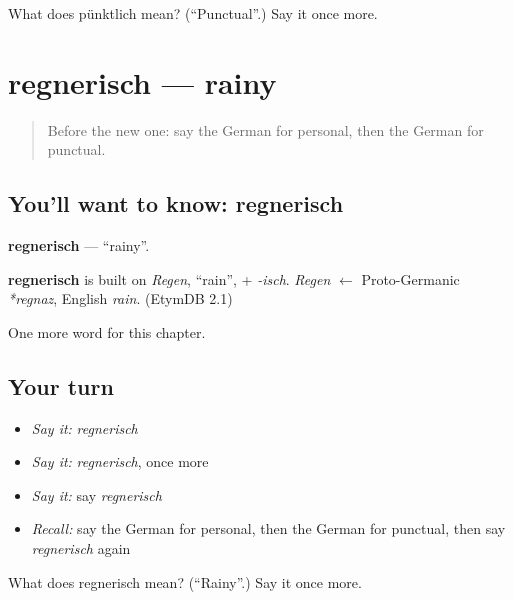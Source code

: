 \begin{tcolorbox}[breakable,colback=teal!4,colframe=teal!35!black,title={Before you move on}]
What does pünktlich mean? (\textquotedblleft{}Punctual\textquotedblright{}.) Say it once more.
\end{tcolorbox}
\section[regnerisch]{regnerisch — rainy}

\label{lesson:GE-C220-regnerisch}



\begin{quote}
Before the new one: say the German for personal, then the German for punctual.
\end{quote}

\subsection*{You'll want to know: regnerisch}
\textbf{regnerisch} — \textquotedblleft{}rainy\textquotedblright{}.

\begin{cousinweb}
\textbf{regnerisch} is built on \emph{Regen}, \textquotedblleft{}rain\textquotedblright{}, + \emph{-isch}. \emph{Regen} $\leftarrow$ Proto-Germanic \emph{*regnaz}, English \emph{rain}. (EtymDB 2.1)
\end{cousinweb}

\begin{grammarlens}[title={What you've built}]
One more word for this chapter.
\end{grammarlens}

\subsection*{Your turn}
\begin{itemize}
\raggedright
  \item \emph{Say it:} \emph{regnerisch}
  \item \emph{Say it:} \emph{regnerisch}, once more
  \item \emph{Say it:} say \emph{regnerisch}
  \item \emph{Recall:} say the German for personal, then the German for punctual, then say \emph{regnerisch} again
\end{itemize}

\begin{tcolorbox}[breakable,colback=teal!4,colframe=teal!35!black,title={Before you move on}]
What does regnerisch mean? (\textquotedblleft{}Rainy\textquotedblright{}.) Say it once more.
\end{tcolorbox}
